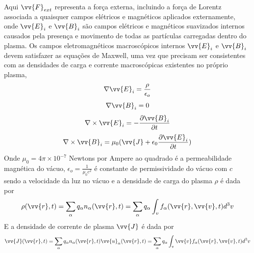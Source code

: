 \documentclass[12pt,oneside,a4paper]{abntex2}
\begin{document}
Aqui $\vv{F}_{ext}$ representa a força externa, incluindo a força de Lorentz associada a quaisquer campos elétricos e magnéticos aplicados externamente, onde $\vv{E}_i$ e $\vv{B}_i$ são campos elétricos e magnéticos suavizados internos causados pela presença e movimento de todas as partículas carregadas dentro do plasma. Os campos eletromagnéticos macroscópicos internos $\vv{E}_i$ e $\vv{B}_i$  devem satisfazer as equações de Maxwell, uma vez que precisam ser consistentes com as densidades de carga e corrente macroscópicas existentes no próprio plasma,
\begin{equation}
\label{eq: max1}
\nabla \vv{E}_i = \frac{\rho}{\epsilon_o}
\end{equation}
\begin{equation}
\label{eq: max2}
\nabla \vv{B}_i = 0
\end{equation}
\begin{equation}
\label{eq: max3}
\nabla \times \vv{E}_i = -\frac{\partial \vv{B}_i}{\partial t}
\end{equation}
\begin{equation}
\label{eq: max4}
\nabla \times \vv{B}_i = \mu_0 (\vv{J} + \epsilon_0 \frac{\partial \vv{E}_i}{\partial t} )
\end{equation}
Onde $\mu_0 = 4\pi \times 10^{-7}$ Newtons por Ampere ao quadrado  é a permeabilidade magnética do vácuo, $\epsilon_o = \frac{1}{\mu_0 c^2}$ é constante de permissividade do vácuo com $c$ sendo a velocidade da luz no vácuo e a densidade de carga do plasma $\rho$ é dada por
\begin{equation}
\label{eq: rho}
\rho(\vv{r},t) = \sum_\alpha q_\alpha n_\alpha(\vv{r},t) = \sum_\alpha q_\alpha \int_v f_\alpha(\vv{r},\vv{v},t) d^3v
\end{equation}
E a densidade de corrente de plasma $\vv{J}$ é dada por
\begin{equation}
\label{eq: densidadecorrente}
\vv{J}(\vv{r},t) = \sum_\alpha q_\alpha n_\alpha(\vv{r},t) \vv{u}_\alpha(\vv{r},t) = \sum_\alpha  q_\alpha \int_v \vv{v} f_\alpha(\vv{r},\vv{v},t) d^3v
\end{equation}
\end{document}
